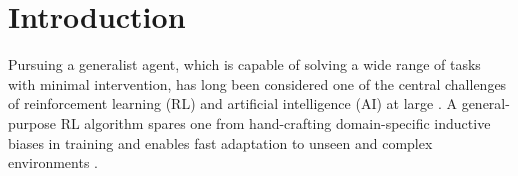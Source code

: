 \documentclass[letterpaper]{article} %
\begin{document}
\begin{abstract}
\end{abstract}



\section{Introduction}
Pursuing a generalist agent, which is capable of solving a wide range of tasks with minimal intervention, has long been considered one of the central challenges of reinforcement learning (RL) and artificial intelligence (AI) at large \cite{reed22gato}. A general-purpose RL algorithm spares one from hand-crafting domain-specific inductive biases in training \cite{silver19bias,li25piprl} and enables fast adaptation to unseen and complex environments \cite{tao22confluence}. 
\end{document}
